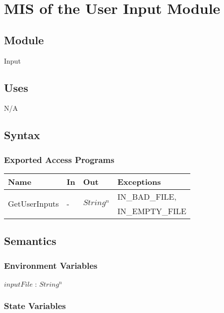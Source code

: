 \documentclass[12pt, titlepage]{article}
\begin{document}
\newpage

\section{MIS of the User Input Module} 
\label{Module_userinput}

\subsection{Module}

Input

\subsection{Uses}

N/A

\subsection{Syntax}

\subsubsection{Exported Access Programs}

\begin{center}
	\begin{tabular}{p{3cm} p{3cm} p{3cm} p{5cm}}
		\hline
		\textbf{Name} & \textbf{In} & \textbf{Out} & \textbf{Exceptions} \\
		\hline
		\multirow{2}{3cm}{GetUserInputs} & \multirow{2}{3cm}{-} & 
		\multirow{2}{3cm}{$String^n$} & IN\_BAD\_FILE, \\
		 &  &  & IN\_EMPTY\_FILE \\
		\hline
	\end{tabular}
\end{center}

\subsection{Semantics}

\subsubsection{Environment Variables}

$inputFile$ : $String^n$

\subsubsection{State Variables}
\end{document}
